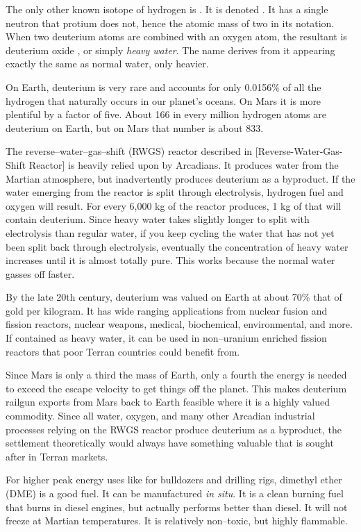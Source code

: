 The only other known isotope of hydrogen is . It is denoted . It has a single neutron that protium does not, hence the atomic mass of two in its notation. When two deuterium atoms are combined with an oxygen atom, the resultant is deuterium oxide , or simply {\it heavy water}. The name derives from it appearing exactly the same as normal water, only heavier.

On Earth, deuterium is very rare and accounts for only 0.0156\% of all the hydrogen that naturally occurs in our planet's oceans. On Mars it is more plentiful by a factor of five. About 166 in every million hydrogen atoms are deuterium on Earth, but on Mars that number is about 833. 

The reverse--water--gas--shift (RWGS) reactor described in [Reverse-Water-Gas-Shift Reactor] is heavily relied upon by Arcadians. It produces water from the Martian atmosphere, but inadvertently produces deuterium as a byproduct. If the water emerging from the reactor is split through electrolysis, hydrogen fuel and oxygen will result. For every 6,000 kg of  the reactor produces, 1 kg of that will contain deuterium. Since heavy water takes slightly longer to split with electrolysis than regular water, if you keep cycling the water that has not yet been split back through electrolysis, eventually the concentration of heavy water increases until it is almost totally pure. This works because the normal water gasses off faster.

By the late 20th century, deuterium was valued on Earth at about 70\% that of gold per kilogram. It has wide ranging applications from nuclear fusion and fission reactors, nuclear weapons, medical, biochemical, environmental, and more. If contained as heavy water, it can be used in non--uranium enriched fission reactors that poor Terran countries could benefit from.

Since Mars is only a third the mass of Earth, only a fourth the energy is needed to exceed the escape velocity to get things off the planet. This makes deuterium railgun exports from Mars back to Earth feasible where it is a highly valued commodity. Since all water, oxygen, and many other Arcadian industrial processes relying on the RWGS reactor produce deuterium as a byproduct, the settlement theoretically would always have something valuable that is sought after in Terran markets.

For higher peak energy uses like for bulldozers and drilling rigs, dimethyl ether  (DME) is a good fuel. It can be manufactured {\it in situ}. It is a clean burning fuel that burns in diesel engines, but actually performs better than diesel. It will not freeze at Martian temperatures. It is relatively non--toxic, but highly flammable.

